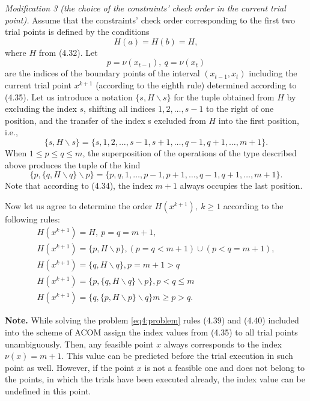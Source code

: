 \emph{Modification 3 (the choice of the constraints’ check order in the current trial point).} Assume that the constraints’ check order corresponding to the first two trial points is defined by
the conditions
\begin{equation}
  H(a)=H(b)=H,
\end{equation}
where $H$ from (4.32). Let
\begin{displaymath}
  p=\nu(x_{t-1}),\: q=\nu(x_t)
\end{displaymath}
are the indices of the boundary points of the interval $(x_{t-1},x_t)$ including the current trial point $x^{k+1}$ (according to the eighth rule) determined according to (4.35). Let us introduce a notation $\{s,H\backslash s\}$ for the tuple obtained from $H$ by excluding the index $s$, shifting all indices $1,2,\dots,s-1$ to the right of one position, and the transfer of the index s excluded from $H$ into the first position, i.e.,
\begin{displaymath}
  \{s,H\backslash s\}=\{s,1,2,\dots,s-1,s+1,\dots,q-1,q+1,\dots,m+1\}.
\end{displaymath}
When $1\le p\le q\le m$, the superposition of the operations of the type described above produces the tuple of the kind
\begin{displaymath}
  \{p,\{q,H\backslash q\}\backslash p\}=\{p,q,1,\dots,p-1,p+1,\dots,q-1,q+1,\dots,m+1\}.
\end{displaymath}
Note that according to (4.34), the index $m+1$ always occupies the last position.

Now let us agree to determine the order $H(x^{k+1}),\: k\ge 1$ according to the following rules:
\begin{gather}
 H(x^{k+1})=H,\: p=q=m+1, \nonumber \\
 H(x^{k+1})=\{p,H\backslash p\}, (p=q<m+1)\cup(p<q=m+1), \nonumber \\
 H(x^{k+1})=\{q,H\backslash q\}, p=m+1>q\\
 H(x^{k+1})=\{p, \{q,H\backslash q\}\backslash p\}, p<q\le m \nonumber \\
 H(x^{k+1})=\{q, \{p,H\backslash p\}\backslash q\} m\ge p>q. \nonumber
\end{gather}

\textbf{Note.} While solving the problem \eqref{eq4:problem} rules (4.39) and (4.40) included into the scheme of ACOM assign the index values from (4.35) to all trial points unambiguously. Then, any feasible point $x$ always corresponds to the index $\nu(x)=m+1$. This value can be predicted before the trial execution in such point as well. However, if the point $x$ is not a feasible one and does not belong to the points, in which the trials have been executed already, the index value can be undefined in this point.

